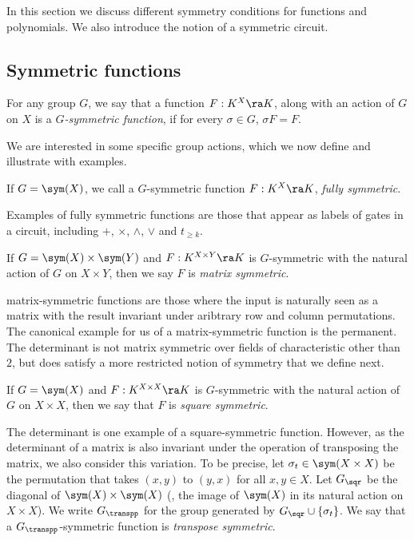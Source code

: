 \documentclass{toc}
\begin{document}
In this section we discuss different symmetry conditions for functions and
polynomials. We also introduce the notion of a symmetric circuit.

\subsection{Symmetric functions}\label{sec:symmetric-functions}

\begin{definition}
  For any group $G$, we say that a function $F: K^X \ra K$, along with an action
  of $G$ on $X$ is a \emph{$G$-symmetric function}, if for every $\sigma \in G$,
  $\sigma F = F$.
\end{definition}

We are interested in some specific group actions, which we now define and
illustrate with examples.

\begin{definition}
  \label{def:full-symm}
  If $G=\sym(X)$, we call a $G$-symmetric function $F: K^X \ra K$, \emph{fully
    symmetric}.
\end{definition}

Examples of fully symmetric functions are those that appear as labels of gates
in a circuit, including $+$, $\times$, $\land$, $\lor$ and $t_{\geq k}$.

\begin{definition}
  If $G = \sym(X) \times \sym(Y)$ and $F : K^{X \times Y} \ra K$ is
  $G$-symmetric with the natural action of $G$ on $X \times Y$, then we say $F$
  is \emph{matrix symmetric}.
\end{definition}

matrix-symmetric functions are those where the input is naturally seen as a
matrix with the result invariant under aribtrary row and column permutations.
The canonical example for us of a matrix-symmetric function is the permanent.
The determinant is not matrix symmetric over fields of characteristic other than
$2$, but does satisfy a more restricted notion of symmetry that we define next.

\begin{definition}
  If $G = \sym(X)$ and $F : K^{X \times X} \ra K$ is $G$-symmetric with the
  natural action of $G$ on $X \times X$, then we say that
  $F$ is \emph{square
    symmetric}.
\end{definition}

The determinant is one example of a square-symmetric function. However, as the
determinant of a matrix is also invariant under the operation of transposing the
matrix, we also consider this variation. To be precise, let $\sigma_t \in \sym(X
\times X)$ be the permutation that takes $(x,y)$ to $(y,x)$ for all $x,y\in X$.
Let $G_{\sqr}$ be the diagonal of $\sym(X)\times \sym(X)$ (\ie, the image of
$\sym(X)$ in its natural action on $X \times X$). We write $G_{\transpp}$ for the
group generated by $G_{\sqr} \cup \{\sigma_t\}$. We say that
%
a $G_{\transpp}$-symmetric function is \emph{transpose symmetric}.
\end{document}
